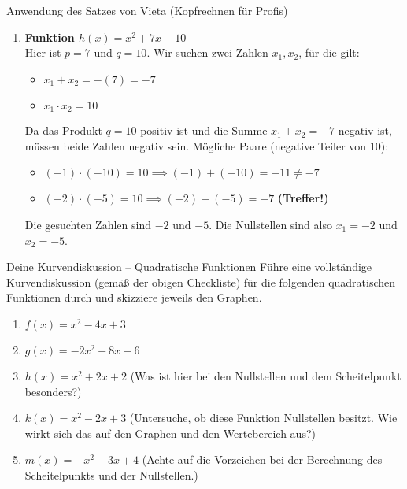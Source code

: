 \begin{loesungsumgebung}{Anwendung des Satzes von Vieta (Kopfrechnen für Profis)}
\begin{enumerate}[label=(\alph*)]
    \item \textbf{Funktion $h(x) = x^2 + 7x + 10$} \\
    Hier ist $p=7$ und $q=10$.
    Wir suchen zwei Zahlen $x_1, x_2$, für die gilt:
    \begin{itemize}
        \item $x_1 + x_2 = -(7) = -7$
        \item $x_1 \cdot x_2 = 10$
    \end{itemize}
    Da das Produkt $q=10$ positiv ist und die Summe $x_1+x_2=-7$ negativ ist, müssen beide Zahlen negativ sein.
    Mögliche Paare (negative Teiler von 10):
    \begin{itemize}
        \item $(-1) \cdot (-10) = 10 \implies (-1)+(-10) = -11 \neq -7$
        \item $(-2) \cdot (-5) = 10 \implies (-2)+(-5) = -7$ \textbf{(Treffer!)}
    \end{itemize}
    Die gesuchten Zahlen sind $-2$ und $-5$.
    Die Nullstellen sind also $x_1 = -2$ und $x_2 = -5$.
\end{enumerate}

\end{loesungsumgebung}


\begin{aufgabenumgebung}{Deine Kurvendiskussion – Quadratische Funktionen}
Führe eine vollständige Kurvendiskussion (gemäß der obigen Checkliste) für die folgenden quadratischen Funktionen durch und skizziere jeweils den Graphen.
\begin{enumerate}
    \item $f(x) = x^2 - 4x + 3$
    \item $g(x) = -2x^2 + 8x - 6$
    \item $h(x) = x^2 + 2x + 2$ (Was ist hier bei den Nullstellen und dem Scheitelpunkt besonders?)
    \item $k(x) = x^2 - 2x + 3$ (Untersuche, ob diese Funktion Nullstellen besitzt. Wie wirkt sich das auf den Graphen und den Wertebereich aus?)
    \item $m(x) = -x^2 - 3x + 4$ (Achte auf die Vorzeichen bei der Berechnung des Scheitelpunkts und der Nullstellen.)
\end{enumerate}
\end{aufgabenumgebung}




